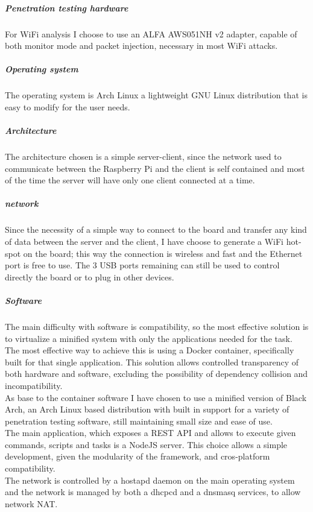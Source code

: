 \documentclass[../PiTest.tex]{subfiles}
\begin{document}
        \subparagraph{Penetration testing hardware}
            For WiFi analysis I choose to use an ALFA AWS051NH v2 adapter, capable of both monitor mode and packet injection, necessary in most WiFi attacks.

        \subparagraph{Operating system}
            The operating system is Arch Linux a lightweight GNU Linux distribution that is easy to modify for the user needs.

        \subparagraph{Architecture}
            The architecture chosen is a simple server-client, since the network used to communicate between the Raspberry Pi and the client is self contained and most of the time the server will have only one client connected at a time.

        \subparagraph{network}
            Since the necessity of a simple way to connect to the board and transfer any kind of data between the server and the client, I have choose to generate a WiFi hot-spot on the board; this way the connection is wireless and fast and the Ethernet port is free to use. The 3 USB ports remaining can still be used to control directly the board or to plug in other devices.

        \subparagraph{Software}
            The main difficulty with software is compatibility, so the most effective solution is to virtualize a minified system with only the applications needed for the task. The most effective way to achieve this is using a Docker container, specifically built for that single application. This solution allows controlled transparency of both hardware and software, excluding the possibility of dependency collision and incompatibility.\\
            As base to the container software I have chosen to use a minified version of Black Arch, an Arch Linux based distribution with built in support for a variety of penetration testing software, still maintaining small size and ease of use. \\
            The main application, which exposes a REST API and allows to execute given commands, scripts and tasks is a NodeJS server. This choice allows a simple development, given the modularity of the framework, and cros-platform compatibility.\\
            The network is controlled by a hostapd daemon on the main operating system and the network is managed by both a dhcpcd and a dnsmasq services, to allow network NAT.


			
\end{document}
